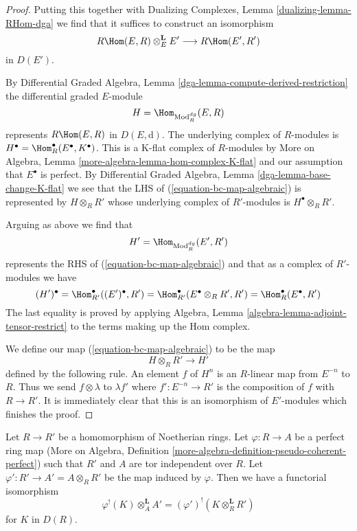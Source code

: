 \begin{proof}
\medskip\noindent
Putting this together with Dualizing Complexes, Lemma
\ref{dualizing-lemma-RHom-dga} we find that it suffices
to construct an isomorphism
\begin{equation}
\label{equation-bc-map-algebraic}
R\Hom(E, R) \otimes_E^\mathbf{L} E'
\longrightarrow
R\Hom(E', R')
\end{equation}
in $D(E')$.

\medskip\noindent
By Differential Graded Algebra, Lemma
\ref{dga-lemma-compute-derived-restriction}
the differential graded $E$-module
$$
H = \Hom_{\text{Mod}^{dg}_R}(E, R)
$$
represents $R\Hom(E, R)$ in $D(E, \text{d})$.
The underlying complex of $R$-modules is
$H^\bullet = \Hom^\bullet_R(E^\bullet, K^\bullet)$. This is a
K-flat complex of $R$-modules by
More on Algebra, Lemma \ref{more-algebra-lemma-hom-complex-K-flat}
and our assumption that $E^\bullet$ is perfect.
By Differential Graded Algebra, Lemma \ref{dga-lemma-base-change-K-flat}
we see that the LHS of (\ref{equation-bc-map-algebraic})
is represented by $H \otimes_R R'$ whose
underlying complex of $R'$-modules is $H^\bullet \otimes_R R'$.

\medskip\noindent
Arguing as above we find that
$$
H' = \Hom_{\text{Mod}^{dg}_R}(E', R')
$$
represents the RHS of (\ref{equation-bc-map-algebraic})
and that as a complex of $R'$-modules we have
$$
(H')^\bullet =
\Hom^\bullet_{R'}((E')^\bullet, R') =
\Hom^\bullet_{R'}(E^\bullet \otimes_R R', R') =
\Hom^\bullet_R(E^\bullet, R')
$$
The last equality is proved by applying
Algebra, Lemma \ref{algebra-lemma-adjoint-tensor-restrict}
to the terms making up the Hom complex.

\medskip\noindent
We define our map (\ref{equation-bc-map-algebraic}) to be the map
$$
H \otimes_R R' \longrightarrow H'
$$
defined by the following rule. An element $f$ of $H^n$ is an $R$-linear
map from $E^{-n}$ to $R$. Thus we send $f \otimes \lambda$ to
$\lambda f'$ where $f' : E^{-n} \to R'$ is the composition of
$f$ with $R \to R'$. It is immediately clear that this is
an isomorphism of $E'$-modules which finishes the proof.
\end{proof}

\begin{lemma}
\label{lemma-bc}
Let $R \to R'$ be a homomorphism of Noetherian rings.
Let $\varphi : R \to A$ be a perfect ring map
(More on Algebra, Definition
\ref{more-algebra-definition-pseudo-coherent-perfect})
such that $R'$ and $A$ are tor independent over $R$.
Let $\varphi' : R' \to A' = A \otimes_R R'$ be the map induced by $\varphi$.
Then we have a functorial isomorphism
$$
\varphi^!(K) \otimes_A^\mathbf{L} A' =
(\varphi')^!(K \otimes_R^\mathbf{L} R')
$$
for $K$ in $D(R)$.
\end{lemma}

